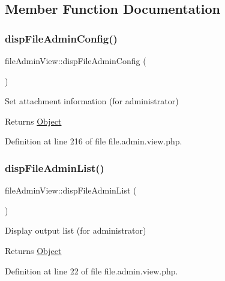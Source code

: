 \subsection{Member Function Documentation}
\mbox{\label{classfileAdminView_a6f748df78cc1df3dd8948dca1a7a04ae}} 
\subsubsection{\texorpdfstring{disp\+File\+Admin\+Config()}{dispFileAdminConfig()}}
{\footnotesize\ttfamily file\+Admin\+View\+::disp\+File\+Admin\+Config (\begin{DoxyParamCaption}{ }\end{DoxyParamCaption})}

Set attachment information (for administrator)

\begin{DoxyReturn}{Returns}
\hyperlink{classObject}{Object} 
\end{DoxyReturn}


Definition at line 216 of file file.\+admin.\+view.\+php.

\mbox{\label{classfileAdminView_aba3607fab303d106fdf650c9a79dc753}} 
\subsubsection{\texorpdfstring{disp\+File\+Admin\+List()}{dispFileAdminList()}}
{\footnotesize\ttfamily file\+Admin\+View\+::disp\+File\+Admin\+List (\begin{DoxyParamCaption}{ }\end{DoxyParamCaption})}

Display output list (for administrator)

\begin{DoxyReturn}{Returns}
\hyperlink{classObject}{Object} 
\end{DoxyReturn}


Definition at line 22 of file file.\+admin.\+view.\+php.

